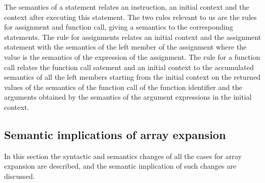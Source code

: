 \documentclass{article}
\begin{document}
\smallskip

The semantics of a statement relates an instruction, an initial context and the
context after executing this statement. The two rules relevant to us are the
rules for assignment and function call, giving a semantics to the corresponding
statements. The rule for assignments relates an initial context and the assignment
statement with the semantics of the left member of the assignment where the
value is the semantics of the expression of the assignment. The rule for a
function call relates the function call satement and an initial context to the
accumulated semantics of all the left members starting from the initial context
on the returned values of the semantics of the function call of the function
identifier and the arguments obtained by the semantics of the argument
expressions in the initial context.


\subsection{Semantic implications of array expansion}

In this section the syntactic and semantics changes of all the cases for array
expansion are described, and the semantic implication of such changes are
discussed.
\end{document}
